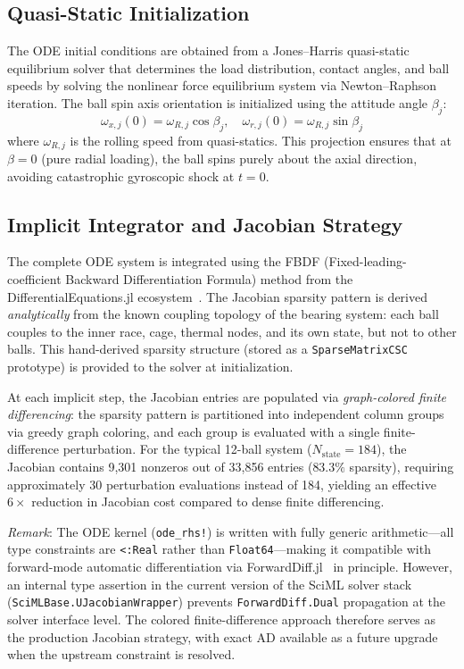 \documentclass[preprint,12pt]{elsarticle}
\begin{document}
\subsection{Quasi-Static Initialization}

The ODE initial conditions are obtained from a Jones--Harris quasi-static equilibrium solver that determines the load distribution, contact angles, and ball speeds by solving the nonlinear force equilibrium system via Newton--Raphson iteration. The ball spin axis orientation is initialized using the attitude angle $\beta_j$:
\begin{equation}
    \omega_{x,j}(0) = \omega_{R,j} \cos\beta_j, \quad
    \omega_{r,j}(0) = \omega_{R,j} \sin\beta_j
    \label{eq:spin_init}
\end{equation}
where $\omega_{R,j}$ is the rolling speed from quasi-statics. This projection ensures that at $\beta = 0$ (pure radial loading), the ball spins purely about the axial direction, avoiding catastrophic gyroscopic shock at $t = 0$.

\subsection{Implicit Integrator and Jacobian Strategy}

The complete ODE system is integrated using the FBDF (Fixed-leading-coefficient Backward Differentiation Formula) method from the DifferentialEquations.jl ecosystem~\cite{Rackauckas2017}. The Jacobian sparsity pattern is derived \emph{analytically} from the known coupling topology of the bearing system: each ball couples to the inner race, cage, thermal nodes, and its own state, but not to other balls. This hand-derived sparsity structure (stored as a \texttt{SparseMatrixCSC} prototype) is provided to the solver at initialization.

At each implicit step, the Jacobian entries are populated via \emph{graph-colored finite differencing}: the sparsity pattern is partitioned into independent column groups via greedy graph coloring, and each group is evaluated with a single finite-difference perturbation. For the typical 12-ball system ($N_{\text{state}} = 184$), the Jacobian contains 9{,}301 nonzeros out of 33{,}856 entries ($83.3\%$ sparsity), requiring approximately 30 perturbation evaluations instead of 184, yielding an effective $6\times$ reduction in Jacobian cost compared to dense finite differencing.

\emph{Remark}: The ODE kernel (\texttt{ode\_rhs!}) is written with fully generic arithmetic---all type constraints are \texttt{<:Real} rather than \texttt{Float64}---making it compatible with forward-mode automatic differentiation via ForwardDiff.jl~\cite{Revels2016} in principle. However, an internal type assertion in the current version of the SciML solver stack (\texttt{SciMLBase.UJacobianWrapper}) prevents \texttt{ForwardDiff.Dual} propagation at the solver interface level. The colored finite-difference approach therefore serves as the production Jacobian strategy, with exact AD available as a future upgrade when the upstream constraint is resolved.
\end{document}
